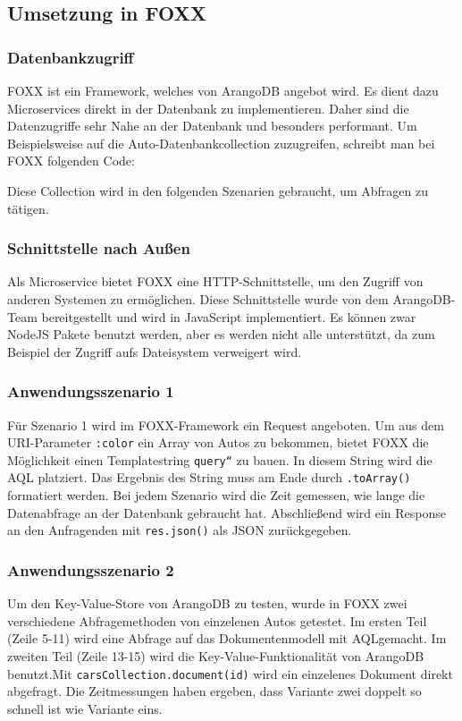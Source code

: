\subsection{Umsetzung in FOXX}
\subsubsection{Datenbankzugriff}
FOXX ist ein Framework, welches von ArangoDB angebot wird. Es dient dazu Microservices direkt in der Datenbank zu implementieren. Daher sind die Datenzugriffe sehr Nahe an der Datenbank und besonders performant. Um Beispielsweise auf die Auto-Datenbankcollection zuzugreifen, schreibt man bei FOXX folgenden Code:

Diese Collection wird in den folgenden Szenarien gebraucht, um Abfragen zu tätigen.
\subsubsection{Schnittstelle nach Außen}
Als Microservice bietet FOXX eine HTTP-Schnittstelle, um den Zugriff von anderen Systemen zu ermöglichen. Diese Schnittstelle wurde von dem ArangoDB-Team bereitgestellt und wird in JavaScript implementiert. Es können zwar NodeJS Pakete benutzt werden, aber es werden nicht alle unterstützt, da zum Beispiel der Zugriff aufs Dateisystem verweigert wird.
\subsubsection{Anwendungsszenario 1}
Für Szenario 1 wird im FOXX-Framework ein Request angeboten. Um aus dem URI-Parameter \texttt{:color} ein Array von Autos zu bekommen, bietet FOXX die Möglichkeit einen Templatestring \texttt{query``} zu bauen. In diesem String wird die \ac{AQL} platziert. Das Ergebnis des String muss am Ende durch \texttt{.toArray()} formatiert werden. Bei jedem Szenario wird die Zeit gemessen, wie lange die Datenabfrage an der Datenbank gebraucht hat. Abschließend wird ein Response an den Anfragenden mit \texttt{res.json()} als \ac{JSON} zurückgegeben.

\subsubsection{Anwendungsszenario 2}
Um den Key-Value-Store von ArangoDB zu testen, wurde in FOXX zwei verschiedene Abfragemethoden von einzelenen Autos getestet. Im ersten Teil (Zeile 5-11) wird eine Abfrage auf das Dokumentenmodell mit \ac{AQL}gemacht. Im zweiten Teil (Zeile 13-15) wird die Key-Value-Funktionalität von ArangoDB benutzt.\newline Mit \texttt{carsCollection.document(id)} wird ein einzelenes Dokument direkt abgefragt. Die Zeitmessungen haben ergeben, dass Variante zwei doppelt so schnell ist wie Variante eins.

